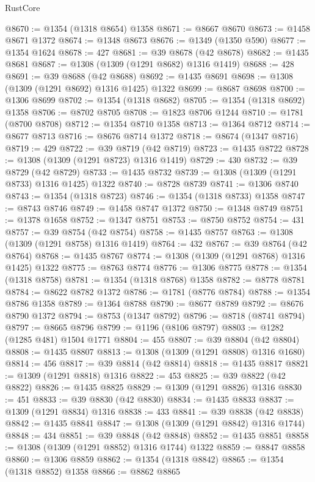 \begin{lexlean}{RustCore}
\begin{coremodule}
@8670 := @1354 (@1318 @8654) @1358
@8671 := @8667 @8670
@8673 := @1458 @8671 @1372
@8674 := @1348 @8673
@8676 := @1349 (@1350 @590)
@8677 := @1354 @1624
@8678 := 427
@8681 := @39 @8678 (@42 @8678)
@8682 := @1435 @8681
@8687 := @1308 (@1309 (@1291 @8682) @1316 @1419)
@8688 := 428
@8691 := @39 @8688 (@42 @8688)
@8692 := @1435 @8691
@8698 := @1308 (@1309 (@1291 @8692) @1316 @1425) @1322
@8699 := @8687 @8698
@8700 := @1306 @8699
@8702 := @1354 (@1318 @8682)
@8705 := @1354 (@1318 @8692) @1358
@8706 := @8702 @8705
@8708 := @1823 @8706 @1244
@8710 := @1781 (@8700 @8708)
@8712 := @1354 @8710 @1358
@8713 := @1364 @8712
@8714 := @8677 @8713
@8716 := @8676 @8714 @1372
@8718 := @8674 (@1347 @8716)
@8719 := 429
@8722 := @39 @8719 (@42 @8719)
@8723 := @1435 @8722
@8728 := @1308 (@1309 (@1291 @8723) @1316 @1419)
@8729 := 430
@8732 := @39 @8729 (@42 @8729)
@8733 := @1435 @8732
@8739 := @1308 (@1309 (@1291 @8733) @1316 @1425) @1322
@8740 := @8728 @8739
@8741 := @1306 @8740
@8743 := @1354 (@1318 @8723)
@8746 := @1354 (@1318 @8733) @1358
@8747 := @8743 @8746
@8749 := @1458 @8747 @1372
@8750 := @1348 @8749
@8751 := @1378 @1658
@8752 := @1347 @8751
@8753 := @8750 @8752
@8754 := 431
@8757 := @39 @8754 (@42 @8754)
@8758 := @1435 @8757
@8763 := @1308 (@1309 (@1291 @8758) @1316 @1419)
@8764 := 432
@8767 := @39 @8764 (@42 @8764)
@8768 := @1435 @8767
@8774 := @1308 (@1309 (@1291 @8768) @1316 @1425) @1322
@8775 := @8763 @8774
@8776 := @1306 @8775
@8778 := @1354 (@1318 @8758)
@8781 := @1354 (@1318 @8768) @1358
@8782 := @8778 @8781
@8784 := @8622 @8782 @1372
@8786 := @1781 (@8776 @8784)
@8788 := @1354 @8786 @1358
@8789 := @1364 @8788
@8790 := @8677 @8789
@8792 := @8676 @8790 @1372
@8794 := @8753 (@1347 @8792)
@8796 := @8718 (@8741 @8794)
@8797 := @8665 @8796
@8799 := @1196 (@8106 @8797)
@8803 := @1282 (@1285 @481) @1504 @1771
@8804 := 455
@8807 := @39 @8804 (@42 @8804)
@8808 := @1435 @8807
@8813 := @1308 (@1309 (@1291 @8808) @1316 @1680)
@8814 := 456
@8817 := @39 @8814 (@42 @8814)
@8818 := @1435 @8817
@8821 := @1309 (@1291 @8818) @1316
@8822 := 453
@8825 := @39 @8822 (@42 @8822)
@8826 := @1435 @8825
@8829 := @1309 (@1291 @8826) @1316
@8830 := 451
@8833 := @39 @8830 (@42 @8830)
@8834 := @1435 @8833
@8837 := @1309 (@1291 @8834) @1316
@8838 := 433
@8841 := @39 @8838 (@42 @8838)
@8842 := @1435 @8841
@8847 := @1308 (@1309 (@1291 @8842) @1316 @1744)
@8848 := 434
@8851 := @39 @8848 (@42 @8848)
@8852 := @1435 @8851
@8858 := @1308 (@1309 (@1291 @8852) @1316 @1744) @1322
@8859 := @8847 @8858
@8860 := @1306 @8859
@8862 := @1354 (@1318 @8842)
@8865 := @1354 (@1318 @8852) @1358
@8866 := @8862 @8865

\end{coremodule}
\end{lexlean}
